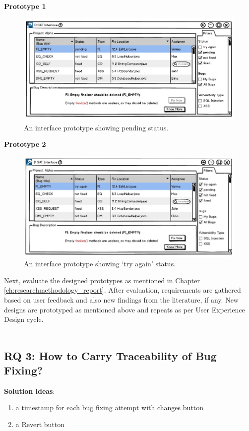\textbf{Prototype 1}
\\
\begin{figure}[hbt!]
	\centering
	\includegraphics[width=\linewidth]{figures/d_pending}
	\caption{An interface prototype showing pending status.}
	\label{fig:d_pending}
\end{figure}

\textbf{Prototype 2}
\\
\begin{figure}[hbt!]
	\centering
	\includegraphics[width=\linewidth]{figures/d_tryagain}
	\caption{An interface prototype showing ‘try again’ status.}
	\label{fig:d_tryagain}
\end{figure}

\clearpage

Next, evaluate the designed prototypes as mentioned in Chapter \ref{ch:researchmethodology_report}. After evaluation, requirements are gathered based on user feedback and also new findings from the literature, if any. New designs are prototyped as mentioned above and repeats as per User Experience Design cycle. \\ \\

\subsection{RQ 3: How to Carry Traceability of Bug Fixing?}
\hfill \break
\textbf{Solution ideas}: \\
\begin{enumerate}
\item  a timestamp for each bug fixing attempt with changes button
\item  a Revert button \\ \\
\end{enumerate}

